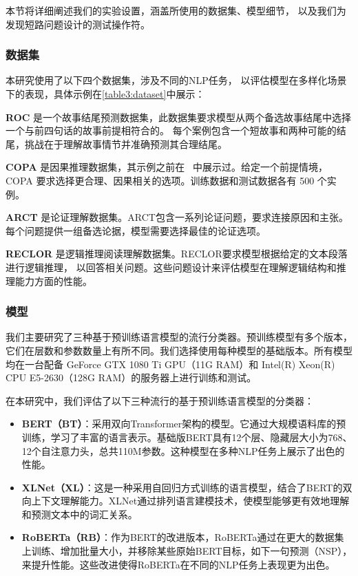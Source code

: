本节将详细阐述我们的实验设置，涵盖所使用的数据集、模型细节，
以及我们为发现短路问题设计的测试操作符。


\subsubsection*{数据集}

本研究使用了以下四个数据集，涉及不同的NLP任务，
以评估模型在多样化场景下的表现，具体示例在\ref{table3:dataset}中展示：

\textbf{ROC} 是一个故事结尾预测数据集，此数据集要求模型从两个备选故事结尾中选择一个与前四句话的故事前提相符合的。
每个案例包含一个短故事和两种可能的结尾，挑战在于理解故事情节并准确预测其合理结尾。

\textbf{COPA} 是因果推理数据集，其示例之前在~ 中展示过。给定一个前提情境，COPA 要求选择更合理、因果相关的选项。训练数据和测试数据各有 500 个实例。

\textbf{ARCT} 是论证理解数据集。ARCT包含一系列论证问题，要求连接原因和主张。
每个问题提供一组备选论据，模型需要选择最佳的论证选项。

\textbf{RECLOR} 是逻辑推理阅读理解数据集。RECLOR要求模型根据给定的文本段落进行逻辑推理，
以回答相关问题。这些问题设计来评估模型在理解逻辑结构和推理能力方面的性能。

\subsubsection*{模型}

我们主要研究了三种基于预训练语言模型的流行分类器。预训练模型有多个版本，它们在层数和参数数量上有所不同。我们选择使用每种模型的基础版本。所有模型均在一台配备 GeForce GTX 1080 Ti GPU（11G RAM）和 Intel(R) Xeon(R) CPU E5-2630（128G RAM）的服务器上进行训练和测试。

在本研究中，我们评估了以下三种流行的基于预训练语言模型的分类器：

\begin{itemize}
    \item \textbf{BERT（BT）}：采用双向Transformer架构的模型。它通过大规模语料库的预训练，学习了丰富的语言表示。基础版BERT具有12个层、隐藏层大小为768、12个自注意力头，总共110M参数。这种模型在多种NLP任务上展示了出色的性能。

    \item \textbf{XLNet（XL）}：这是一种采用自回归方式训练的语言模型，结合了BERT的双向上下文理解能力。XLNet通过排列语言建模技术，使模型能够更有效地理解和预测文本中的词汇关系。

    \item \textbf{RoBERTa（RB）}：作为BERT的改进版本，RoBERTa通过在更大的数据集上训练、增加批量大小，并移除某些原始BERT目标，如下一句预测（NSP），来提升性能。这些改进使得RoBERTa在不同的NLP任务上表现更为出色。
\end{itemize}

